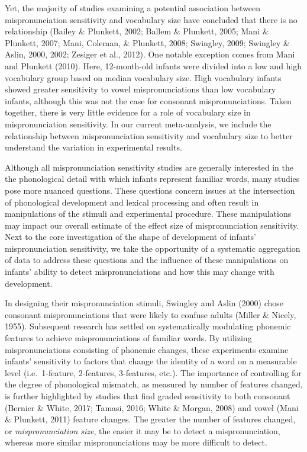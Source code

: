 \documentclass[man]{apa6}
\theoremstyle{definition}
\theoremstyle{definition}
\theoremstyle{definition}
\theoremstyle{remark}
\begin{document}
Yet, the majority of studies examining a potential association between
mispronunciation sensitivity and vocabulary size have concluded that
there is no relationship (Bailey \& Plunkett, 2002; Ballem \& Plunkett,
2005; Mani \& Plunkett, 2007; Mani, Coleman, \& Plunkett, 2008;
Swingley, 2009; Swingley \& Aslin, 2000, 2002; Zesiger et al., 2012).
One notable exception comes from Mani and Plunkett (2010). Here,
12-month-old infants were divided into a low and high vocabulary group
based on median vocabulary size. High vocabulary infants showed greater
sensitivity to vowel mispronunciations than low vocabulary infants,
although this was not the case for consonant mispronunciations. Taken
together, there is very little evidence for a role of vocabulary size in
mispronunciation sensitivity. In our current meta-analysis, we include
the relationship between mispronunciation sensitivity and vocabulary
size to better understand the variation in experimental results.

Although all mispronunciation sensitivity studies are generally
interested in the the phonological detail with which infants represent
familiar words, many studies pose more nuanced questions. These
questions concern issues at the intersection of phonological development
and lexical processing and often result in manipulations of the stimuli
and experimental procedure. These manipulations may impact our overall
estimate of the effect size of mispronunciation sensitivity. Next to the
core investigation of the shape of development of infants'
mispronunciation sensitivity, we take the opportunity of a systematic
aggregation of data to address these questions and the influence of
these manipulations on infants' ability to detect mispronunciations and
how this may change with development.

In designing their mispronunciation stimuli, Swingley and Aslin (2000)
chose consonant mispronunciations that were likely to confuse adults
(Miller \& Nicely, 1955). Subsequent research has settled on
systematically modulating phonemic features to achieve mispronunciations
of familiar words. By utilizing mispronunciations consisting of phonemic
changes, these experiments examine infants' sensitivity to factors that
change the identity of a word on a measurable level (i.e.~1-feature,
2-features, 3-features, etc.). The importance of controlling for the
degree of phonological mismatch, as measured by number of features
changed, is further highlighted by studies that find graded sensitivity
to both consonant (Bernier \& White, 2017; Tamasi, 2016; White \&
Morgan, 2008) and vowel (Mani \& Plunkett, 2011) feature changes. The
greater the number of features changed, or \emph{mispronunciation size},
the easier it may be to detect a mispronunciation, whereas more similar
mispronunciations may be more difficult to detect.
\end{document}
